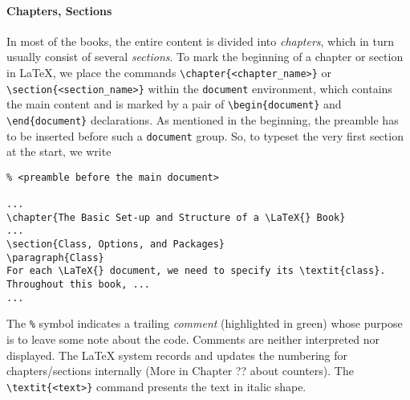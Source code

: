 \paragraph{Chapters, Sections}
In most of the books, the entire content is divided into \textit{chapters}, which in turn usually consist of several \textit{sections}. To mark the beginning of a chapter or section in \LaTeX{}, we place the commands \texttt{\textbackslash chapter\{<chapter\_name>\}} or \texttt{\textbackslash section\{<section\_name>\}} within the \verb|document| environment, which contains the main content and is marked by a pair of \texttt{\textbackslash begin\{document\}} and \texttt{\textbackslash end\{document\}} declarations. As mentioned in the beginning, the preamble has to be inserted before such a \verb|document| group. So, to typeset the very first section at the start, we write
\begin{lstlisting}
% <preamble before the main document>

...
\chapter{The Basic Set-up and Structure of a \LaTeX{} Book}
...
\section{Class, Options, and Packages}
\paragraph{Class}
For each \LaTeX{} document, we need to specify its \textit{class}. Throughout this book, ...
...

\end{lstlisting}
The \verb|%| symbol indicates a trailing \textit{comment} (highlighted in green) whose purpose is to leave some note about the code. Comments are neither interpreted nor displayed. The \LaTeX{} system records and updates the numbering for chapters/sections internally (More in Chapter ?? about counters). The \texttt{\textbackslash textit\{<text>\}} command presents the text in italic shape.

